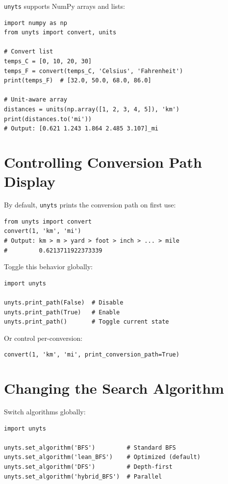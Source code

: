 \documentclass[11pt,a4paper]{report}
\begin{document}
\texttt{unyts} supports NumPy arrays and lists:

\begin{lstlisting}[style=pythonstyle]
import numpy as np
from unyts import convert, units

# Convert list
temps_C = [0, 10, 20, 30]
temps_F = convert(temps_C, 'Celsius', 'Fahrenheit')
print(temps_F)  # [32.0, 50.0, 68.0, 86.0]

# Unit-aware array
distances = units(np.array([1, 2, 3, 4, 5]), 'km')
print(distances.to('mi'))  
# Output: [0.621 1.243 1.864 2.485 3.107]_mi
\end{lstlisting}

\section{Controlling Conversion Path Display}

By default, \texttt{unyts} prints the conversion path on first use:

\begin{lstlisting}[style=pythonstyle]
from unyts import convert
convert(1, 'km', 'mi')
# Output: km > m > yard > foot > inch > ... > mile
#         0.6213711922373339
\end{lstlisting}

Toggle this behavior globally:

\begin{lstlisting}[style=pythonstyle]
import unyts

unyts.print_path(False)  # Disable
unyts.print_path(True)   # Enable
unyts.print_path()       # Toggle current state
\end{lstlisting}

Or control per-conversion:

\begin{lstlisting}[style=pythonstyle]
convert(1, 'km', 'mi', print_conversion_path=True)
\end{lstlisting}

\section{Changing the Search Algorithm}

Switch algorithms globally:

\begin{lstlisting}[style=pythonstyle]
import unyts

unyts.set_algorithm('BFS')         # Standard BFS
unyts.set_algorithm('lean_BFS')    # Optimized (default)
unyts.set_algorithm('DFS')         # Depth-first
unyts.set_algorithm('hybrid_BFS')  # Parallel
\end{lstlisting}
\end{document}
